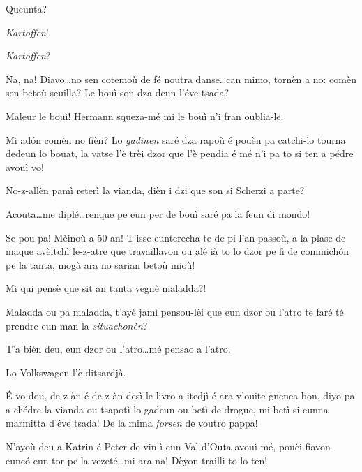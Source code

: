 \begin{drama}
\Cesarspeaks Queunta?

\Hermannspeaks \textit{Kartoffen}!

\Katrinspeaks \textit{Kartoffen}?


\Hermannspeaks{} Na, na! Diavo\ldots no sen cotemoù de fé noutra danse\ldots can mimo, tornèn a no: comèn sen betoù seuilla? Le bouì son dza deun l'éve tsada?

\Cesarspeaks Maleur le bouì! Hermann squeza-mé mi le bouì n'i fran oublia-le.

\Hermannspeaks{} Mi ad\'on comèn no fièn? Lo \textit{gadinen} saré dza rapoù é pouèn pa catchi-lo tourna dedeun lo bouat, la vatse l'è trèi dzor que l'è pendia é mé n'i pa to si ten a pédre avouì vo! 


\Hermannspeaks{} No-z-allèn pamì reterì la vianda, dièn i dzi que son si \og Scherzi a parte\fg ?

\Cesarspeaks {} Acouta\ldots me diplé\ldots renque pe eun per de bouì saré pa la feun di mondo!

\Hermannspeaks Se pou pa! Mèinoù a 50 an! T’isse eunterecha-te de pi l'an passoù, a la plase de maque avèitchì le-z-atre que travaillavon ou alé ià to lo dzor pe fi de commich\'on pe la tanta, mogà ara no sarian betoù mioù!

\Cesarspeaks Mi qui pensè que sit an tanta vegnè maladda?!

\Hermannspeaks{} Maladda ou pa maladda, t'ayè jamì pensou-lèi que eun dzor ou l’atro te faré té prendre eun man la \textit{situachonèn}? 

\Cesarspeaks T'a bièn deu, eun dzor ou l'atro\ldots mé pensao a l'atro.


\Remyspeaks Lo Volkswagen l'è ditsardjà.

\Hermannspeaks{} \'E vo dou, de-z-àn é de-z-àn desì le livro a itedjì é ara v'ouite gnenca bon, diyo pa a chédre la vianda ou tsapotì lo gadeun ou betì de drogue, mi betì si eunna marmitta d’éve tsada! De la mima \textit{forsen} de voutro pappa!

\Hermannspeaks{} N'ayoù deu a Katrin é Peter de vin-ì eun Val d'Outa avouì mé, pouèi fiavon eunc\'o eun tor pe la vezeté\ldots mi ara na! Dèyon traillì to lo ten!


\end{drama}
